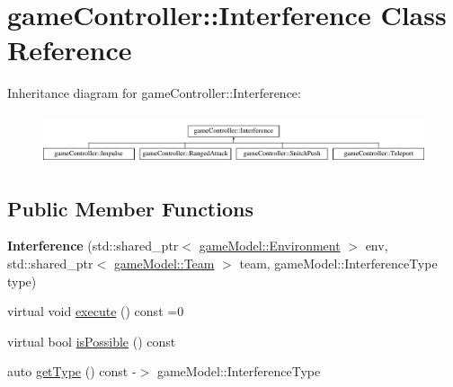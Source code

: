 \hypertarget{classgame_controller_1_1_interference}{\section{game\-Controller\-:\-:Interference Class Reference}
\label{classgame_controller_1_1_interference}
}
Inheritance diagram for game\-Controller\-:\-:Interference\-:\begin{figure}[H]
\begin{center}
\leavevmode
\includegraphics[height=1.473684cm]{classgame_controller_1_1_interference}
\end{center}
\end{figure}
\subsection*{Public Member Functions}
\begin{DoxyCompactItemize}
\item 
\hypertarget{classgame_controller_1_1_interference_a1e664266c768fafd6fc4339e08741d5a}{{\bfseries Interference} (std\-::shared\-\_\-ptr$<$ \hyperlink{classgame_model_1_1_environment}{game\-Model\-::\-Environment} $>$ env, std\-::shared\-\_\-ptr$<$ \hyperlink{classgame_model_1_1_team}{game\-Model\-::\-Team} $>$ team, game\-Model\-::\-Interference\-Type type)}\label{classgame_controller_1_1_interference_a1e664266c768fafd6fc4339e08741d5a}

\item 
virtual void \hyperlink{classgame_controller_1_1_interference_aa5ced37bf22486e1cc290bc6679c2db2}{execute} () const =0
\item 
virtual bool \hyperlink{classgame_controller_1_1_interference_a06b9adc5df035e184e7ed0cf5d4a8814}{is\-Possible} () const 
\item 
auto \hyperlink{classgame_controller_1_1_interference_a694aa2cd65bbb35c02f1ca4ed7701ebe}{get\-Type} () const -\/$>$ game\-Model\-::\-Interference\-Type
\end{DoxyCompactItemize}
